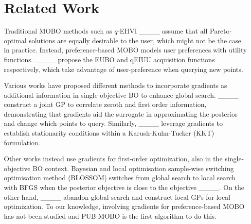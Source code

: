 \section{Related Work}
Traditional MOBO methods such as $q$-EHVI ____ assume that all Pareto-optimal solutions are equally desirable to the user, which might not be the case in practice. Instead, preference-based MOBO models user preferences with utility functions. ____ propose the EUBO and qEIUU acquisition functions respectively, which take advantage of user-preference when querying new points.

Various works have proposed different methods to incorporate gradients as additional information in single-objective BO to enhance global search. ____ construct a joint GP to correlate zeroth and first order information, demonstrating that gradients aid the surrogate in approximating the posterior and change which points to query. Similarly, ____ leverage gradients to establish stationarity conditions within a Karush-Kuhn-Tucker (KKT) formulation.

Other works instead use gradients for first-order optimization, also in the single-objective BO context. Bayesian and local optimisation sample-wise switching optimisation method (BLOSSOM) switches from global search to local search with BFGS when the posterior objective is close to the objective ____. On the other hand, ____ abandon global search and construct local GPs for local optimization. 
%
To our knowledge, involving gradients for preference-based MOBO has not been studied and PUB-MOBO is the first algorithm to do this.